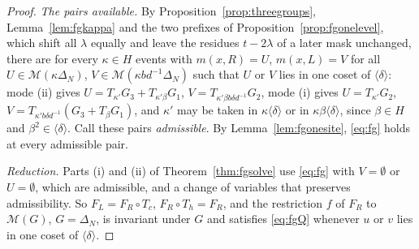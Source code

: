 \begin{proof}
\emph{The pairs available.} By Proposition~\ref{prop:threegroups}, Lemma~\ref{lem:fgkappa} and the two prefixes of Proposition~\ref{prop:fgonelevel}, which shift all $\lambda$ equally and leave the residues $t-2\lambda$ of a later mask unchanged, there are for every $\kappa\in H$ events with $m(x,R)=U$, $m(x,L)=V$ for all $U\in\mathcal{M}(\kappa\Delta_N)$, $V\in\mathcal{M}(\kappa bd^{-1}\Delta_N)$ such that $U$ or $V$ lies in one coset of $\langle\delta\rangle$: mode (ii) gives $U=T_{\kappa'}G_3+T_{\kappa'\beta}G_1$, $V=T_{\kappa'\beta b\delta d^{-1}}G_2$, mode (i) gives $U=T_{\kappa'}G_2$, $V=T_{\kappa'b\delta d^{-1}}(G_3+T_\beta G_1)$, and $\kappa'$ may be taken in $\kappa\langle\delta\rangle$ or in $\kappa\beta\langle\delta\rangle$, since $\beta\in H$ and $\beta^{2}\in\langle\delta\rangle$. Call these pairs \emph{admissible}. By Lemma~\ref{lem:fgonesite}, \eqref{eq:fg} holds at every admissible pair.

\emph{Reduction.} Parts (i) and (ii) of Theorem~\ref{thm:fgsolve} use \eqref{eq:fg} with $V=\emptyset$ or $U=\emptyset$, which are admissible, and a change of variables that preserves admissibility. So $F_L=F_R\circ T_c$, $F_R\circ T_h=F_R$, and the restriction $f$ of $F_R$ to $\mathcal{M}(G)$, $G=\Delta_N$, is invariant under $G$ and satisfies \eqref{eq:fgQ} whenever $u$ or $v$ lies in one coset of $\langle\delta\rangle$.


\end{proof}
